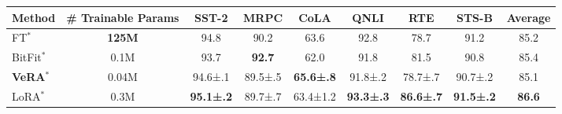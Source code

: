 \begin{tabular}{lcccccccc}
\toprule
Method & \# Trainable Params & SST-2 & MRPC & CoLA & QNLI & RTE & STS-B & Average \\
\midrule
FT$^*$ & \bfseries 125M & 94.8 & 90.2 & 63.6 & 92.8 & 78.7 & 91.2 & 85.2 \\
BitFit$^*$ & 0.1M & 93.7 & \bfseries 92.7 & 62.0 & 91.8 & 81.5 & 90.8 & 85.4 \\
\bfseries VeRA$^*$ & 0.04M & 94.6\tiny ±.1 & 89.5\tiny ±.5 & \bfseries 65.6\tiny ±.8 & 91.8\tiny ±.2 & 78.7\tiny ±.7 & 90.7\tiny ±.2 & 85.1 \\
LoRA$^*$ & 0.3M & \bfseries 95.1\tiny ±.2 & 89.7\tiny ±.7 & 63.4\tiny ±1.2 & \bfseries 93.3\tiny ±.3 & \bfseries 86.6\tiny ±.7 & \bfseries 91.5\tiny ±.2 & \bfseries 86.6 \\
\bottomrule
\end{tabular}
